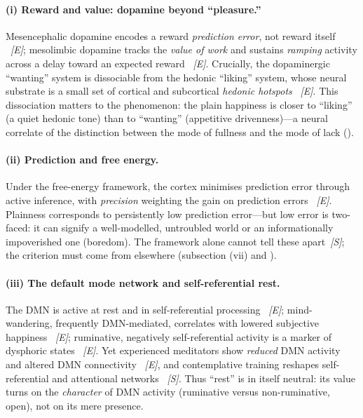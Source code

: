\paragraph{(i) Reward and value: dopamine beyond ``pleasure.''} Mesencephalic dopamine encodes a reward \emph{prediction error}, not reward itself \parencite{schultz1997}~\emph{[E]}; mesolimbic dopamine tracks the \emph{value of work} and sustains \emph{ramping} activity across a delay toward an expected reward \parencite{hamid2016}~\emph{[E]}. Crucially, the dopaminergic ``wanting'' system is dissociable from the hedonic ``liking'' system, whose neural substrate is a small set of cortical and subcortical \emph{hedonic hotspots} \parencite{berridge2015,kringelbach2009}~\emph{[E]}. This dissociation matters to the phenomenon: the plain happiness is closer to ``liking'' (a quiet hedonic tone) than to ``wanting'' (appetitive drivenness)---a neural correlate of the distinction between the mode of fullness and the mode of lack ().

\paragraph{(ii) Prediction and free energy.} Under the free-energy framework, the cortex minimises prediction error through active inference, with \emph{precision} weighting the gain on prediction errors \parencite{friston2010}~\emph{[E]}. Plainness corresponds to persistently low prediction error---but low error is two-faced: it can signify a well-modelled, untroubled world or an informationally impoverished one (boredom). The framework alone cannot tell these apart~\emph{[S]}; the criterion must come from elsewhere (subsection (vii) and ).

\paragraph{(iii) The default mode network and self-referential rest.} The DMN is active at rest and in self-referential processing \parencite{raichle2001,northoff2006}~\emph{[E]}; mind-wandering, frequently DMN-mediated, correlates with lowered subjective happiness \parencite{killingsworth2010}~\emph{[E]}; ruminative, negatively self-referential activity is a marker of dysphoric states \parencite{nolenhoeksema2008}~\emph{[E]}. Yet experienced meditators show \emph{reduced} DMN activity and altered DMN connectivity \parencite{brewer2011}~\emph{[E]}, and contemplative training reshapes self-referential and attentional networks \parencite{tang2015,lutz2008}~\emph{[S]}. Thus ``rest'' is in itself neutral: its value turns on the \emph{character} of DMN activity (ruminative versus non-ruminative, open), not on its mere presence.

